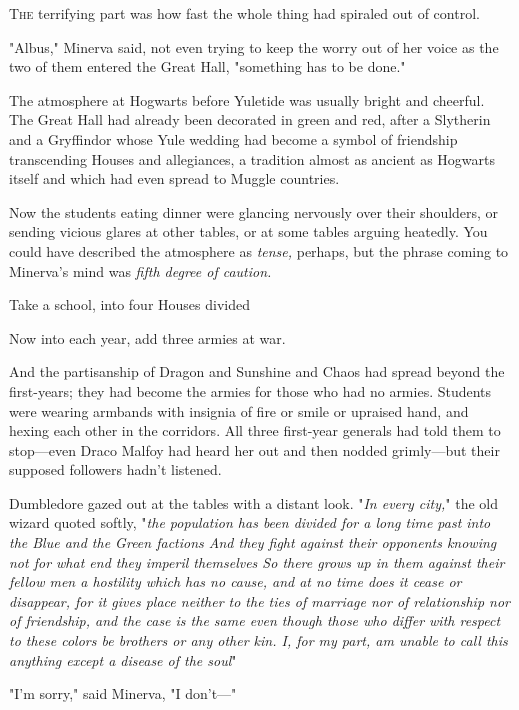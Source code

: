 
\lettrine{T}{he} terrifying part was how fast the whole thing had spiraled out of control.

"Albus," Minerva said, not even trying to keep the worry out of her voice as
the two of them entered the Great Hall, "something has to be done."

The atmosphere at Hogwarts before Yuletide was usually bright and cheerful. The
Great Hall had already been decorated in green and red, after a Slytherin and a
Gryffindor whose Yule wedding had become a symbol of friendship transcending
Houses and allegiances, a tradition almost as ancient as Hogwarts itself and
which had even spread to Muggle countries.

Now the students eating dinner were glancing nervously over their shoulders, or
sending vicious glares at other tables, or at some tables arguing heatedly. You
could have described the atmosphere as \emph{tense,} perhaps, but the phrase
coming to Minerva's mind was \emph{fifth degree of caution.}

Take a school, into four Houses divided{\el}

Now into each year, add three armies at war.

And the partisanship of Dragon and Sunshine and Chaos had spread beyond the
first-years; they had become the armies for those who had no armies. Students
were wearing armbands with insignia of fire or smile or upraised hand, and
hexing each other in the corridors. All three first-year generals had told them
to stop---even Draco Malfoy had heard her out and then nodded grimly---but
their supposed followers hadn't listened.

Dumbledore gazed out at the tables with a distant look. "\emph{In every city,}"
the old wizard quoted softly, "\emph{the population has been divided for a long
time past into the Blue and the Green factions{\el} And they fight against
their opponents knowing not for what end they imperil themselves{\el} So
there grows up in them against their fellow men a hostility which has no cause,
and at no time does it cease or disappear, for it gives place neither to the
ties of marriage nor of relationship nor of friendship, and the case is the
same even though those who differ with respect to these colors be brothers or
any other kin. I, for my part, am unable to call this anything except a disease
of the soul{\el}}"

"I'm sorry," said Minerva, "I don't\mbox{---}"

